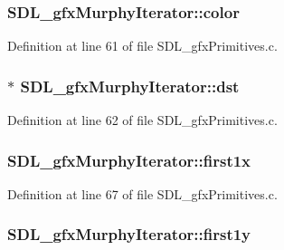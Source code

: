\subsubsection[{color}]{ S\+D\+L\+\_\+gfx\+Murphy\+Iterator\+::color}\label{struct_s_d_l__gfx_murphy_iterator_add81cc0a301e921f0f48c163871c44db}


Definition at line 61 of file S\+D\+L\+\_\+gfx\+Primitives.\+c.

\hypertarget{struct_s_d_l__gfx_murphy_iterator_a25002bd39f0f0ec9d4d57f043fa52ab0}{}
\subsubsection[{dst}]{$\ast$ S\+D\+L\+\_\+gfx\+Murphy\+Iterator\+::dst}\label{struct_s_d_l__gfx_murphy_iterator_a25002bd39f0f0ec9d4d57f043fa52ab0}


Definition at line 62 of file S\+D\+L\+\_\+gfx\+Primitives.\+c.

\hypertarget{struct_s_d_l__gfx_murphy_iterator_a7fe231e388ca94977506000c39e18820}{}
\subsubsection[{first1x}]{ S\+D\+L\+\_\+gfx\+Murphy\+Iterator\+::first1x}\label{struct_s_d_l__gfx_murphy_iterator_a7fe231e388ca94977506000c39e18820}


Definition at line 67 of file S\+D\+L\+\_\+gfx\+Primitives.\+c.

\hypertarget{struct_s_d_l__gfx_murphy_iterator_a8cef51d9d2bbb106e59080955e6b42ef}{}
\subsubsection[{first1y}]{ S\+D\+L\+\_\+gfx\+Murphy\+Iterator\+::first1y}\label{struct_s_d_l__gfx_murphy_iterator_a8cef51d9d2bbb106e59080955e6b42ef}


